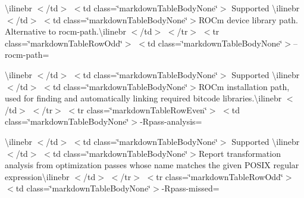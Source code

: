 \begin{longtabu}
{\ttfamily \textbackslash{}ilinebr \texorpdfstring{$<$}{<}/td\texorpdfstring{$>$}{>} \texorpdfstring{$<$}{<}td class=\char`\"{}markdown\+Table\+Body\+None\char`\"{}\texorpdfstring{$>$}{>} Supported \textbackslash{}ilinebr \texorpdfstring{$<$}{<}/td\texorpdfstring{$>$}{>} \texorpdfstring{$<$}{<}td class=\char`\"{}markdown\+Table\+Body\+None\char`\"{}\texorpdfstring{$>$}{>}}ROCm device library path. Alternative to rocm-\/path.{\ttfamily \textbackslash{}ilinebr \texorpdfstring{$<$}{<}/td\texorpdfstring{$>$}{>} \texorpdfstring{$<$}{<}/tr\texorpdfstring{$>$}{>} \texorpdfstring{$<$}{<}tr class=\char`\"{}markdown\+Table\+Row\+Odd\char`\"{}\texorpdfstring{$>$}{>} \texorpdfstring{$<$}{<}td class=\char`\"{}markdown\+Table\+Body\+None\char`\"{}\texorpdfstring{$>$}{>}}--rocm-\/path=

{\ttfamily \textbackslash{}ilinebr \texorpdfstring{$<$}{<}/td\texorpdfstring{$>$}{>} \texorpdfstring{$<$}{<}td class=\char`\"{}markdown\+Table\+Body\+None\char`\"{}\texorpdfstring{$>$}{>} Supported \textbackslash{}ilinebr \texorpdfstring{$<$}{<}/td\texorpdfstring{$>$}{>} \texorpdfstring{$<$}{<}td class=\char`\"{}markdown\+Table\+Body\+None\char`\"{}\texorpdfstring{$>$}{>}}ROCm installation path, used for finding and automatically linking required bitcode libraries.{\ttfamily \textbackslash{}ilinebr \texorpdfstring{$<$}{<}/td\texorpdfstring{$>$}{>} \texorpdfstring{$<$}{<}/tr\texorpdfstring{$>$}{>} \texorpdfstring{$<$}{<}tr class=\char`\"{}markdown\+Table\+Row\+Even\char`\"{}\texorpdfstring{$>$}{>} \texorpdfstring{$<$}{<}td class=\char`\"{}markdown\+Table\+Body\+None\char`\"{}\texorpdfstring{$>$}{>}}-\/Rpass-\/analysis=

{\ttfamily \textbackslash{}ilinebr \texorpdfstring{$<$}{<}/td\texorpdfstring{$>$}{>} \texorpdfstring{$<$}{<}td class=\char`\"{}markdown\+Table\+Body\+None\char`\"{}\texorpdfstring{$>$}{>} Supported \textbackslash{}ilinebr \texorpdfstring{$<$}{<}/td\texorpdfstring{$>$}{>} \texorpdfstring{$<$}{<}td class=\char`\"{}markdown\+Table\+Body\+None\char`\"{}\texorpdfstring{$>$}{>}}Report transformation analysis from optimization passes whose name matches the given POSIX regular expression{\ttfamily \textbackslash{}ilinebr \texorpdfstring{$<$}{<}/td\texorpdfstring{$>$}{>} \texorpdfstring{$<$}{<}/tr\texorpdfstring{$>$}{>} \texorpdfstring{$<$}{<}tr class=\char`\"{}markdown\+Table\+Row\+Odd\char`\"{}\texorpdfstring{$>$}{>} \texorpdfstring{$<$}{<}td class=\char`\"{}markdown\+Table\+Body\+None\char`\"{}\texorpdfstring{$>$}{>}}-\/Rpass-\/missed=


\end{longtabu}
